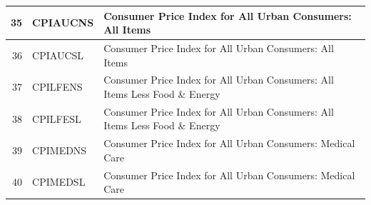 \documentclass[12pt]{article}
\begin{document}
\begin{table}[ht]
\begin{tabular}{r|p{4cm}p{11cm}}
	\hline
	35 & CPIAUCNS & Consumer Price Index for All Urban Consumers: All Items \\ 
	\hline
	36 & CPIAUCSL & Consumer Price Index for All Urban Consumers: All Items \\ 
	\hline
	37 & CPILFENS & Consumer Price Index for All Urban Consumers: All Items Less Food \& Energy \\ 
	\hline
	38 & CPILFESL & Consumer Price Index for All Urban Consumers: All Items Less Food \& Energy \\ 
	\hline
	39 & CPIMEDNS & Consumer Price Index for All Urban Consumers: Medical Care \\ 
	\hline
	40 & CPIMEDSL & Consumer Price Index for All Urban Consumers: Medical Care \\ 
	\hline
\end{tabular}
\end{table}
\end{document}
